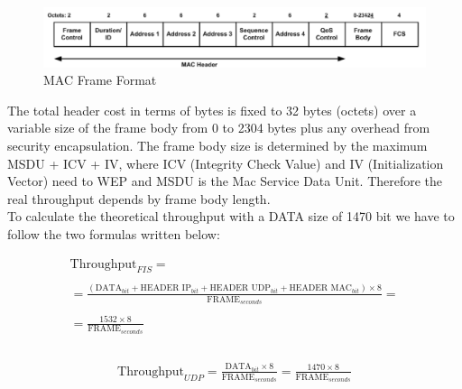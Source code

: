	\begin{figure}[h!]
		\includegraphics[angle=0, keepaspectratio=true, width=15cm]{../images/mac_header2}
		\caption{MAC Frame Format}
		\label{mac_packet}
	\end{figure}
	
	The total header cost in terms of bytes is fixed to 32 bytes (octets) over a variable size of the frame body from 0 to 2304 bytes plus any overhead from security encapsulation. The frame body size is determined by the maximum MSDU + ICV + IV, where ICV (Integrity Check Value) and IV (Initialization Vector) need to WEP and MSDU is the Mac Service Data Unit. Therefore the real throughput depends by frame body length.\\
	
	
	To calculate the theoretical throughput with a DATA size of 1470 bit we have to follow the two formulas written below:
	
	\begin{gather*}
		\textrm{Throughput}_{FIS} = \\\\
		= \frac{ ( \textrm{DATA}_{bit} + \textrm{HEADER IP}_{bit} + \textrm{HEADER UDP}_{bit} + \textrm{HEADER MAC}_{bit} ) \times 8 }{ \textrm{FRAME}_{seconds} } = \\\\
		= \frac{ 1532 \times 8 }{  \textrm{FRAME}_{seconds} } \\\\
	\end{gather*}
	
	\begin{gather*}
		\textrm{Throughput}_{UDP} = \frac{ \textrm{DATA}_{bit} \times 8 }{ \textrm{FRAME}_{seconds} } = \frac{ 1470 \times 8 }{  \textrm{FRAME}_{seconds} } \\\\
	\end{gather*}
	
